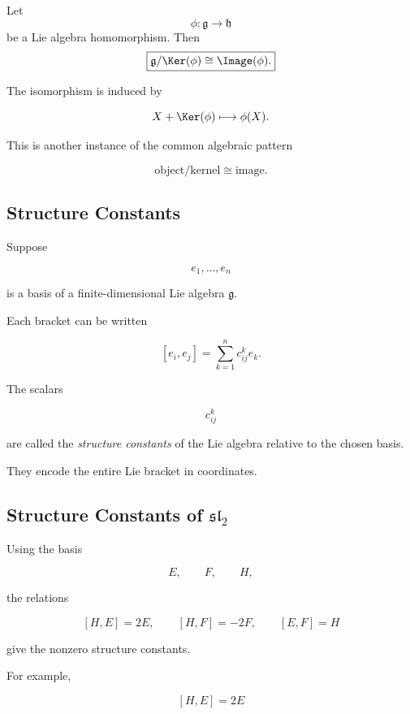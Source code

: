 \begin{theorem}
Let
\[ \phi:\mathfrak g\to\mathfrak h \]
be a Lie algebra homomorphism. Then
\[ \boxed{\mathfrak g/\Ker(\phi)\cong\Image(\phi).} \]
\end{theorem}

The isomorphism is induced by

\[ X+\Ker(\phi)\longmapsto\phi(X). \]

This is another instance of the common algebraic pattern

\[ \text{object}/\text{kernel}\cong\text{image}. \]

\subsection{Structure Constants}
\label{subsec:structure-constants}

Suppose

\[ e_1,\ldots,e_n \]

is a basis of a finite-dimensional Lie algebra \(\mathfrak g\).

Each bracket can be written

\[ [e_i,e_j]=\sum_{k=1}^{n}c_{ij}^{k}e_k. \]

The scalars

\[ c_{ij}^{k} \]

are called the \emph{structure constants} of the Lie algebra relative to the
chosen basis.

They encode the entire Lie bracket in coordinates.

\subsection{Structure Constants of \(\mathfrak{sl}_2\)}
\label{subsec:sl2-structure-constants}

Using the basis

\[ E,\qquad F,\qquad H, \]

the relations

\[ [H,E]=2E,\qquad[H,F]=-2F,\qquad[E,F]=H \]

give the nonzero structure constants.

For example,

\[ [H,E]=2E \]


